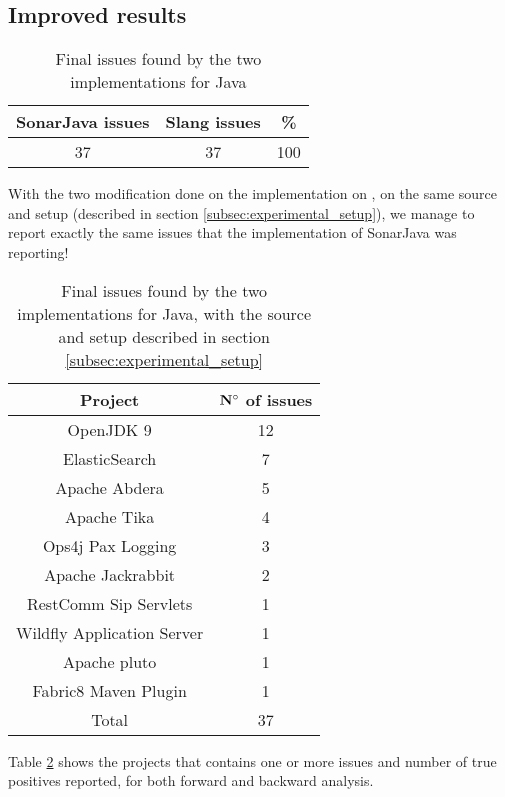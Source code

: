 \subsection{Improved results}
\label{subsec:improved_results}

\begin{table}[h]
	\centering
	\caption{Final issues found by the two implementations for Java}
	\label{table:final-sonarjava-vs-slang}
	\begin{tabular}{|c|c|c|}
		\hline
		\bf SonarJava issues & \bf Slang issues & \bf \% \\ \hline
		37 &  37 &  100 \\ \hline
	\end{tabular}
\end{table}

With the two modification done on the implementation on \slang{}, on the same source and setup (described in section \ref{subsec:experimental_setup}), we manage to report exactly the same issues that the implementation of SonarJava was reporting!

\begin{table}[h]
	\centering
	\caption{Final issues found by the two implementations for Java, with the source and setup described in section \ref{subsec:experimental_setup}}
	\label{table:issues-per-project}
	\begin{tabular}{|c|c|}
		\hline
		\bf Project & \bf $\bf N^{\circ}$  of issues\\ \hline
		OpenJDK 9 & 12 \\
		ElasticSearch & 7 \\
		Apache Abdera & 5 \\
		Apache Tika & 	4 \\
		Ops4j Pax Logging & 3 \\
		Apache Jackrabbit & 2 \\
		RestComm Sip Servlets & 1 \\
		Wildfly Application Server & 1 \\
		Apache pluto & 1 \\
		Fabric8 Maven Plugin & 1 \\\hline
		Total &  37 \\ \hline
	\end{tabular}
\end{table}


Table \ref{table:issues-per-project} shows the projects that contains one or more issues and number of true positives reported, for both forward and backward analysis. 

